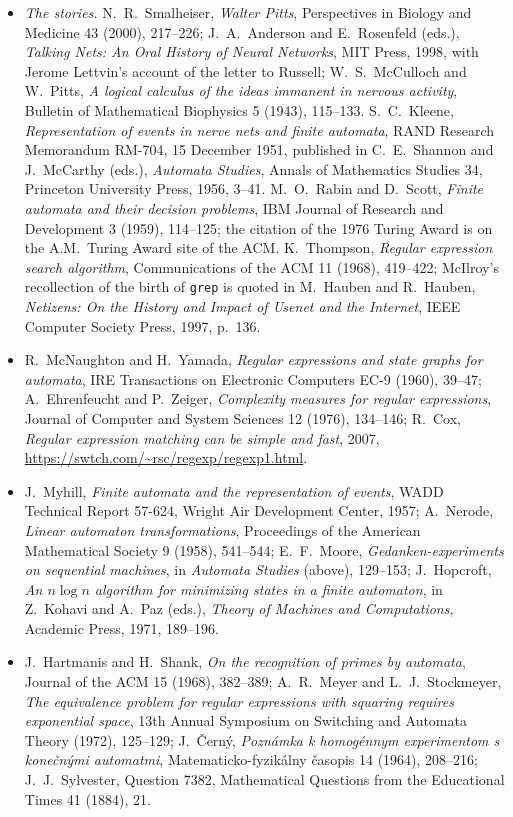 \begin{itemize}
\item \emph{The stories.} N.~R.~Smalheiser, \emph{Walter Pitts}, Perspectives in Biology and Medicine 43 (2000), 217--226; J.~A.~Anderson and E.~Rosenfeld (eds.), \emph{Talking Nets: An Oral History of Neural Networks}, MIT Press, 1998, with Jerome Lettvin's account of the letter to Russell; W.~S.~McCulloch and W.~Pitts, \emph{A logical calculus of the ideas immanent in nervous activity}, Bulletin of Mathematical Biophysics 5 (1943), 115--133. S.~C.~Kleene, \emph{Representation of events in nerve nets and finite automata}, RAND Research Memorandum RM-704, 15 December 1951, published in C.~E.~Shannon and J.~McCarthy (eds.), \emph{Automata Studies}, Annals of Mathematics Studies 34, Princeton University Press, 1956, 3--41. M.~O.~Rabin and D.~Scott, \emph{Finite automata and their decision problems}, IBM Journal of Research and Development 3 (1959), 114--125; the citation of the 1976 Turing Award is on the A.M.~Turing Award site of the ACM. K.~Thompson, \emph{Regular expression search algorithm}, Communications of the ACM 11 (1968), 419--422; McIlroy's recollection of the birth of \texttt{grep} is quoted in M.~Hauben and R.~Hauben, \emph{Netizens: On the History and Impact of Usenet and the Internet}, IEEE Computer Society Press, 1997, p.~136.
\item R.~McNaughton and H.~Yamada, \emph{Regular expressions and state graphs for automata}, IRE Transactions on Electronic Computers EC-9 (1960), 39--47; A.~Ehrenfeucht and P.~Zeiger, \emph{Complexity measures for regular expressions}, Journal of Computer and System Sciences 12 (1976), 134--146; R.~Cox, \emph{Regular expression matching can be simple and fast}, 2007, \url{https://swtch.com/~rsc/regexp/regexp1.html}.
\item J.~Myhill, \emph{Finite automata and the representation of events}, WADD Technical Report 57-624, Wright Air Development Center, 1957; A.~Nerode, \emph{Linear automaton transformations}, Proceedings of the American Mathematical Society 9 (1958), 541--544; E.~F.~Moore, \emph{Gedanken-experiments on sequential machines}, in \emph{Automata Studies} (above), 129--153; J.~Hopcroft, \emph{An $n\log n$ algorithm for minimizing states in a finite automaton}, in Z.~Kohavi and A.~Paz (eds.), \emph{Theory of Machines and Computations}, Academic Press, 1971, 189--196.
\item J.~Hartmanis and H.~Shank, \emph{On the recognition of primes by automata}, Journal of the ACM 15 (1968), 382--389; A.~R.~Meyer and L.~J.~Stockmeyer, \emph{The equivalence problem for regular expressions with squaring requires exponential space}, 13th Annual Symposium on Switching and Automata Theory (1972), 125--129; J.~Černý, \emph{Poznámka k homogénnym experimentom s konečnými automatmi}, Matematicko-fyzikálny časopis 14 (1964), 208--216; J.~J.~Sylvester, Question 7382, Mathematical Questions from the Educational Times 41 (1884), 21.

\end{itemize}
